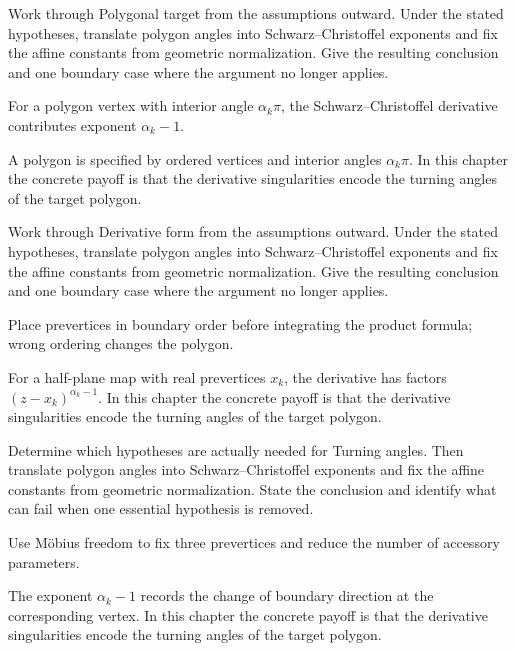 \begin{exercise}\label{exr:iv18-01}
Work through Polygonal target from the assumptions outward. Under the stated hypotheses, translate polygon angles into Schwarz--Christoffel exponents and fix the affine constants from geometric normalization. Give the resulting conclusion and one boundary case where the argument no longer applies.
\end{exercise}
\begin{hint}
For a polygon vertex with interior angle \(\alpha_k\pi\), the Schwarz--Christoffel derivative contributes exponent \(\alpha_k-1\).
\end{hint}
\begin{solution}
A polygon is specified by ordered vertices and interior angles $\alpha_k\pi$. In this chapter the concrete payoff is that the derivative singularities encode the turning angles of the target polygon.
\end{solution}

\begin{exercise}\label{exr:iv18-02}
Work through Derivative form from the assumptions outward. Under the stated hypotheses, translate polygon angles into Schwarz--Christoffel exponents and fix the affine constants from geometric normalization. Give the resulting conclusion and one boundary case where the argument no longer applies.
\end{exercise}
\begin{hint}
Place prevertices in boundary order before integrating the product formula; wrong ordering changes the polygon.
\end{hint}
\begin{solution}
For a half-plane map with real prevertices $x_k$, the derivative has factors $(z-x_k)^{\alpha_k-1}$. In this chapter the concrete payoff is that the derivative singularities encode the turning angles of the target polygon.
\end{solution}

\begin{exercise}\label{exr:iv18-03}
Determine which hypotheses are actually needed for Turning angles. Then translate polygon angles into Schwarz--Christoffel exponents and fix the affine constants from geometric normalization. State the conclusion and identify what can fail when one essential hypothesis is removed.
\end{exercise}
\begin{hint}
Use Möbius freedom to fix three prevertices and reduce the number of accessory parameters.
\end{hint}
\begin{solution}
The exponent $\alpha_k-1$ records the change of boundary direction at the corresponding vertex. In this chapter the concrete payoff is that the derivative singularities encode the turning angles of the target polygon.
\end{solution}

